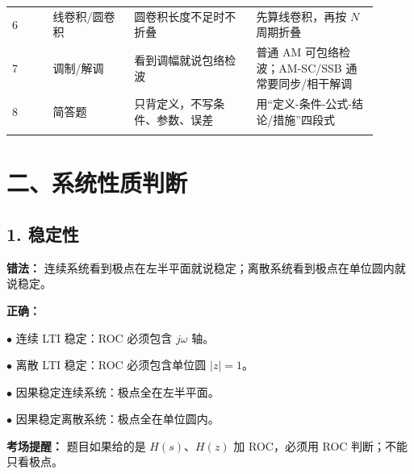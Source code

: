 \documentclass[11pt]{ctexart}
\begin{document}
\begin{center}
\begin{longtable}{p{0.10\linewidth} p{0.20\linewidth} p{0.30\linewidth} p{0.30\linewidth}}
6 & 线卷积/圆卷积 & 圆卷积长度不足时不折叠 & 先算线卷积，再按 \(N\) 周期折叠 \\

\addlinespace[2pt]

7 & 调制/解调 & 看到调幅就说包络检波 & 普通 AM 可包络检波；AM-SC/SSB 通常要同步/相干解调 \\

\addlinespace[2pt]

8 & 简答题 & 只背定义，不写条件、参数、误差 & 用“定义-条件-公式-结论/措施”四段式 \\

\addlinespace[2pt]

\bottomrule

\end{longtable}

\normalsize

\end{center}





\section*{二、系统性质判断}



\subsection*{1. 稳定性}



\textbf{错法：} 连续系统看到极点在左半平面就说稳定；离散系统看到极点在单位圆内就说稳定。\par



\textbf{正确：}\par



\noindent\(\bullet\) 连续 LTI 稳定：ROC 必须包含 \(j\omega\) 轴。\par

\noindent\(\bullet\) 离散 LTI 稳定：ROC 必须包含单位圆 \(|z|=1\)。\par

\noindent\(\bullet\) 因果稳定连续系统：极点全在左半平面。\par

\noindent\(\bullet\) 因果稳定离散系统：极点全在单位圆内。\par



\textbf{考场提醒：} 题目如果给的是 \(H(s)\)、\(H(z)\) 加 ROC，必须用 ROC 判断；不能只看极点。\par
\end{document}
